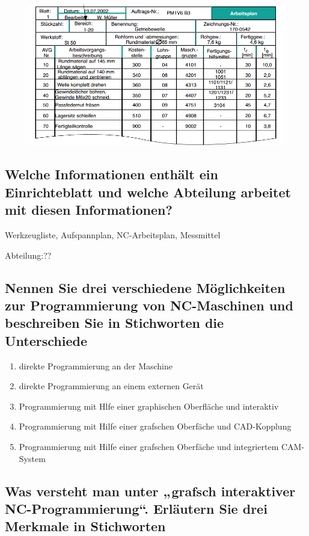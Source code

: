 \begin{figure}[h]
\centering
\includegraphics[scale=0.7]{Bild2_3.png}
\end{figure}

\subsection*{Welche Informationen enthält ein Einrichteblatt und welche Abteilung arbeitet mit diesen Informationen?}

Werkzeugliste, Aufspannplan, NC-Arbeitsplan, Messmittel

Abteilung:??

\subsection*{Nennen Sie drei verschiedene Möglichkeiten zur Programmierung von NC-Maschinen und beschreiben Sie in Stichworten die Unterschiede}

\begin{enumerate}[1)]
\item direkte Programmierung an der Maschine
\item direkte Programmierung an einem externen Gerät
\item Programmierung mit Hlfe einer graphischen Oberfläche und interaktiv
\item Programmierung mit Hilfe einer grafschen Oberfäche und CAD-Kopplung
\item Programmierung mit Hilfe einer grafschen Oberfäche und integriertem CAM-System
\end{enumerate}

\subsection*{Was versteht man unter „grafsch interaktiver NC-Programmierung“. Erläutern Sie drei Merkmale in Stichworten}

